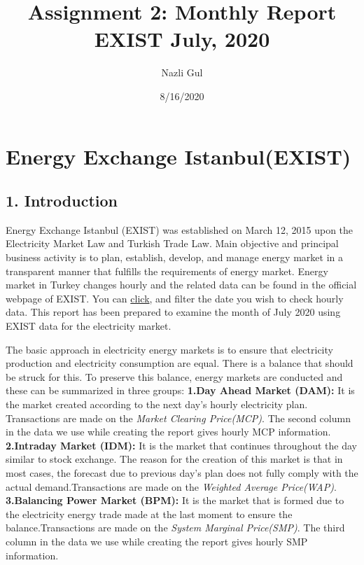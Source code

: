 \documentclass[
]{article}
\title{Assignment 2: Monthly Report EXIST July, 2020}
\author{Nazli Gul}
\date{8/16/2020}
\begin{document}
\maketitle

\hypertarget{energy-exchange-istanbulexist}{%
\section{Energy Exchange
Istanbul(EXIST)}\label{energy-exchange-istanbulexist}}

\hypertarget{introduction}{%
\subsection{1. Introduction}\label{introduction}}

Energy Exchange Istanbul (EXIST) was established on March 12, 2015 upon
the Electricity Market Law and Turkish Trade Law. Main objective and
principal business activity is to plan, establish, develop, and manage
energy market in a transparent manner that fulfills the requirements of
energy market. Energy market in Turkey changes hourly and the related
data can be found in the official webpage of EXIST. You can
\href{https://rapor.epias.com.tr/rapor/xhtml/ptfSmfListeleme.xhtml}{click},
and filter the date you wish to check hourly data. This report has been
prepared to examine the month of July 2020 using EXIST data for the
electricity market.

The basic approach in electricity energy markets is to ensure that
electricity production and electricity consumption are equal. There is a
balance that should be struck for this. To preserve this balance, energy
markets are conducted and these can be summarized in three groups:
\textbf{1.Day Ahead Market (DAM):} It is the market created according to
the next day's hourly electricity plan. Transactions are made on the
\emph{Market Clearing Price(MCP)}. The second column in the data we use
while creating the report gives hourly MCP information.
\textbf{2.Intraday Market (IDM):} It is the market that continues
throughout the day similar to stock exchange. The reason for the
creation of this market is that in most cases, the forecast due to
previous day's plan does not fully comply with the actual
demand.Transactions are made on the \emph{Weighted Average Price(WAP)}.
\textbf{3.Balancing Power Market (BPM):} It is the market that is formed
due to the electricity energy trade made at the last moment to ensure
the balance.Transactions are made on the \emph{System Marginal
Price(SMP)}. The third column in the data we use while creating the
report gives hourly SMP information.
\end{document}
